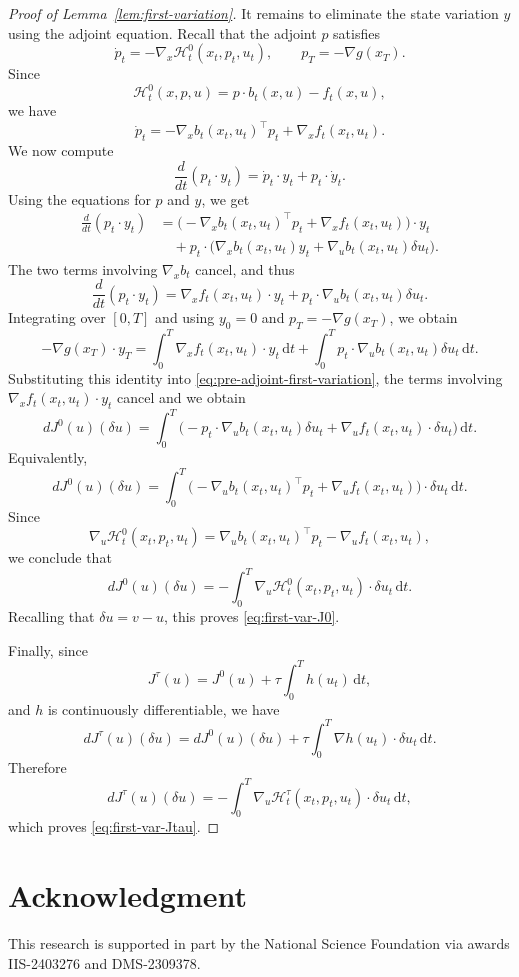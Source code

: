 \documentclass[11pt]{amsart}
\theoremstyle{plain}
\theoremstyle{definition}
\theoremstyle{remark}
\newcommand{\dd}{\,\mathrm{d}}
\begin{document}
\begin{proof}[Proof of Lemma~\ref{lem:first-variation}]
It remains to eliminate the state variation $y$ using the adjoint equation.
Recall that the adjoint $p$ satisfies
\[
\dot p_t
=
-\nabla_x \mathcal H_t^0(x_t,p_t,u_t),
\qquad
p_T= - \nabla g(x_T).
\]
Since
\[
\mathcal H_t^0(x,p,u)=p\cdot b_t(x,u) - f_t(x,u),
\]
we have
\[
\dot p_t
=
-\nabla_x b_t(x_t,u_t)^\top p_t + \nabla_x f_t(x_t,u_t).
\]
We now compute
\[
\frac{d}{dt}(p_t\cdot y_t)=\dot p_t\cdot y_t+p_t\cdot \dot y_t.
\]
Using the equations for $p$ and $y$, we get
\begin{align*}
\frac{d}{dt}(p_t\cdot y_t)
&=
\Big(-\nabla_x b_t(x_t,u_t)^\top p_t + \nabla_x f_t(x_t,u_t)\Big)\cdot y_t \\
&\quad
+
p_t\cdot
\Big(
\nabla_x b_t(x_t,u_t)y_t+\nabla_u b_t(x_t,u_t)\delta u_t
\Big).
\end{align*}
The two terms involving $\nabla_x b_t$ cancel, and thus
\[
\frac{d}{dt}(p_t\cdot y_t)
=
\nabla_x f_t(x_t,u_t)\cdot y_t
+
p_t\cdot \nabla_u b_t(x_t,u_t)\delta u_t.
\]
Integrating over $[0,T]$ and using $y_0=0$ and $p_T= - \nabla g(x_T)$, we obtain
\[
- \nabla g(x_T)\cdot y_T
=
\int_0^T \nabla_x f_t(x_t,u_t)\cdot y_t\dd t
+
\int_0^T p_t\cdot \nabla_u b_t(x_t,u_t)\delta u_t\dd t.
\]
Substituting this identity into \eqref{eq:pre-adjoint-first-variation}, the
terms involving $\nabla_x f_t(x_t,u_t)\cdot y_t$ cancel and we obtain
\[
dJ^0(u)(\delta u)
=
\int_0^T
\Big(
- p_t\cdot \nabla_u b_t(x_t,u_t)\delta u_t
+
\nabla_u f_t(x_t,u_t)\cdot \delta u_t
\Big)\dd t.
\]
Equivalently,
\[
dJ^0(u)(\delta u)
=
\int_0^T
\Big(
-\nabla_u b_t(x_t,u_t)^\top p_t+\nabla_u f_t(x_t,u_t)
\Big)\cdot \delta u_t\dd t.
\]
Since
\[
\nabla_u \mathcal H_t^0(x_t,p_t,u_t)
=
\nabla_u b_t(x_t,u_t)^\top p_t - \nabla_u f_t(x_t,u_t),
\]
we conclude that
\[
dJ^0(u)(\delta u)
=
- \int_0^T \nabla_u \mathcal H_t^0(x_t,p_t,u_t)\cdot \delta u_t\dd t.
\]
Recalling that $\delta u=v-u$, this proves \eqref{eq:first-var-J0}.

Finally, since
\[
J^\tau(u)=J^0(u)+\tau \int_0^T h(u_t)\dd t,
\]
and $h$ is continuously differentiable, we have
\[
dJ^\tau(u)(\delta u)
=
dJ^0(u)(\delta u)
+
\tau \int_0^T \nabla h(u_t)\cdot \delta u_t\dd t.
\]
Therefore
\[
dJ^\tau(u)(\delta u)
=
- \int_0^T \nabla_u \mathcal H_t^\tau(x_t,p_t,u_t)\cdot \delta u_t\dd t,
\]
which proves \eqref{eq:first-var-Jtau}.
\end{proof}

\section*{Acknowledgment}
This research is supported in part by the National Science Foundation via awards IIS-2403276 and DMS-2309378.



\end{document}
